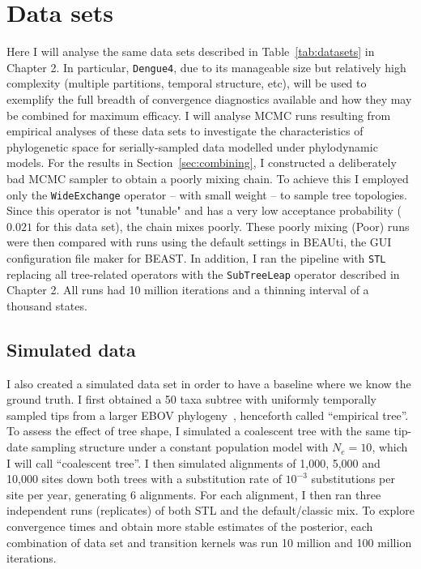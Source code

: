 \section{Data sets}
\label{sec:data}

Here I will analyse the same data sets described in Table~\ref{tab:datasets} in Chapter 2.
In particular, \verb|Dengue4|, due to its manageable size but relatively high complexity (multiple partitions, temporal structure, etc), will be used to exemplify the full breadth of convergence diagnostics available and how they may be combined for maximum efficacy.
I will analyse MCMC runs resulting from empirical analyses of these data sets to investigate the characteristics of phylogenetic space for serially-sampled data modelled under phylodynamic models.
For the results in Section~\ref{sec:combining}, I constructed a deliberately bad MCMC sampler to obtain a poorly mixing chain.
To achieve this I employed only the \verb|WideExchange| operator  -- with small weight -- to sample tree topologies.
Since this operator is not "tunable" and has a very low acceptance probability ($0.021$ for this data set), the chain mixes poorly.
These poorly mixing (Poor) runs were then compared with runs using the default settings in BEAUti, the GUI configuration file maker for BEAST.
In addition, I ran the pipeline with \verb|STL| replacing all tree-related operators with the \verb|SubTreeLeap| operator described in Chapter 2.
All runs had 10 million iterations and a thinning interval of a thousand states. 

\subsection{Simulated data}
\label{sec:simudata}

I also created a simulated data set in order to have a baseline where we know the ground truth.
I first obtained a 50 taxa subtree with uniformly temporally sampled tips from a larger EBOV phylogeny~\citep{Dudas2017}, henceforth called ``empirical tree''.
To assess the effect of tree shape, I simulated a coalescent tree with the same tip-date sampling structure under a constant population model with $N_e = 10$, which I will call ``coalescent tree''.
I then simulated alignments of 1,000, 5,000 and 10,000 sites down both trees with a substitution rate of $10^{-3}$ substitutions per site per year, generating 6 alignments.
For each alignment, I then ran three independent runs (replicates) of both STL and the default/classic mix.
To explore convergence times and obtain more stable estimates of the posterior, each combination of data set and transition kernels was run 10 million and 100 million iterations.

